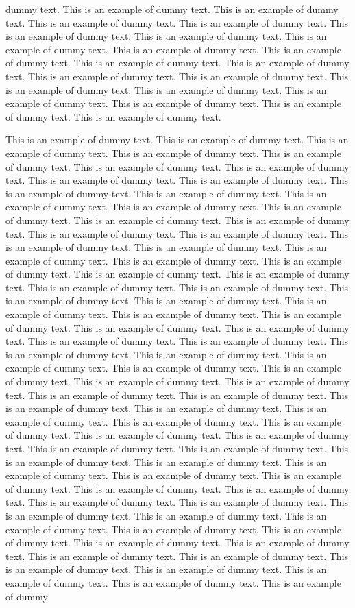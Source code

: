\documentclass[lineno]{jfm}
\begin{document}
dummy text. This is an example of dummy text. This is an example of dummy text. This is an example of dummy text. This is an example of dummy text. This is an example of dummy text. This is an example of dummy text. This is an example of dummy text. This is an example of dummy text. This is an example of dummy text. This is an example of dummy text. This is an example of dummy text. This is an example of dummy text. This is an example of dummy text. This is an example of dummy text. This is an example of dummy text. This is an example of dummy text. This is an example of dummy text. This is an example of dummy text. This is an example of dummy text.

This is an example of dummy text. This is an example of dummy text. This is an example of dummy text. This is an example of dummy text. This is an example of dummy text. This is an example of dummy text. This is an example of dummy text. This is an example of dummy text. This is an example of dummy text. This is an example of dummy text. This is an example of dummy text. This is an example of dummy text. This is an example of dummy text. This is an example of dummy text. This is an example of dummy text. This is an example of dummy text. This is an example of dummy text. This is an example of dummy text. This is an example of dummy text. This is an example of dummy text. This is an example of dummy text. This is an example of dummy text. This is an example of dummy text. This is an example of dummy text. This is an example of dummy text. This is an example of dummy text. This is an example of dummy text. This is an example of dummy text. This is an example of dummy text. This is an example of dummy text. This is an example of dummy text. This is an example of dummy text. This is an example of dummy text. This is an example of dummy text. This is an example of dummy text. This is an example of dummy text. This is an example of dummy text. This is an example of dummy text. This is an example of dummy text. This is an example of dummy text. This is an example of dummy text. This is an example of dummy text. This is an example of dummy text. This is an example of dummy text. This is an example of dummy text. This is an example of dummy text. This is an example of dummy text. This is an example of dummy text. This is an example of dummy text. This is an example of dummy text. This is an example of dummy text. This is an example of dummy text. This is an example of dummy text. This is an example of dummy text. This is an example of dummy text. This is an example of dummy text. This is an example of dummy text. This is an example of dummy text. This is an example of dummy text. This is an example of dummy text. This is an example of dummy text. This is an example of dummy text. This is an example of dummy text. This is an example of dummy text. This is an example of dummy text. This is an example of dummy text. This is an example of dummy text. This is an example of dummy text. This is an example of dummy text. This is an example of dummy text. This is an example of dummy text. This is an example of dummy text. This is an example of dummy text. This is an example of dummy text. This is an example of dummy text. This is an example of dummy text. This is an example of dummy 
\end{document}
